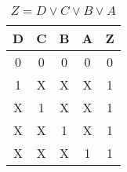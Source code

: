 
\begin{center}
    \begin{table}[h] \caption{\(Z = D \lor C \lor B \lor A \)}
        \begin{center}
            \begin{tabular}{|c|c|c|c||c|} \hline
            D & C & B & A & Z \\ \hline\hline
            0 & 0 & 0 & 0 & 0 \\ \hline
            1 & X & X & X & 1 \\ \hline
            X & 1 & X & X & 1 \\ \hline
            X & X & 1 & X & 1 \\ \hline
            X & X & X & 1 & 1 \\ \hline
            \end{tabular}
        \end{center}
    \end{table}
\end{center}
